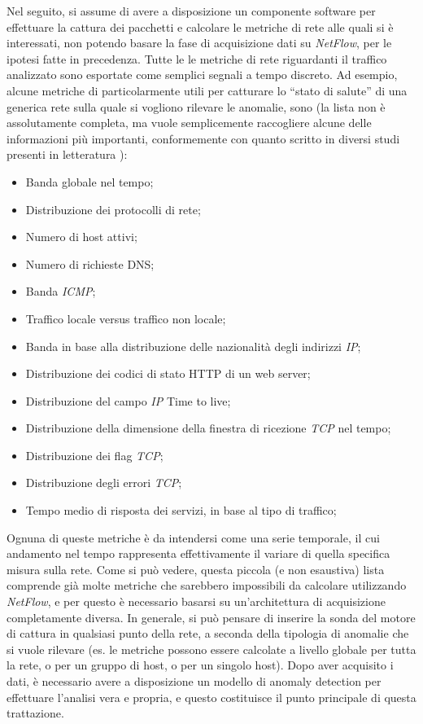 \documentclass[12pt,a4paper,cucitura]{toptesi}
\begin{document}
Nel seguito, si assume di avere a disposizione un componente software per effettuare la cattura dei pacchetti e calcolare le metriche di rete alle quali si è interessati, non potendo basare la fase di acquisizione dati su \emph{NetFlow}, per le ipotesi fatte in precedenza.
Tutte le le metriche di rete riguardanti il traffico analizzato sono esportate come semplici segnali a tempo discreto.
Ad esempio, alcune metriche di particolarmente utili per catturare lo ``stato di salute'' di una generica rete sulla quale si vogliono rilevare le anomalie, sono (la lista non è assolutamente completa, ma vuole semplicemente raccogliere alcune delle informazioni più importanti, conformemente con quanto scritto in diversi studi presenti in letteratura \cite{ntop}):

\begin{itemize}
\item Banda globale nel tempo; 
\item Distribuzione dei protocolli di rete;
\item Numero di host attivi;
\item Numero di richieste DNS;
\item Banda \emph{ICMP};
\item Traffico locale versus traffico non locale;
\item Banda in base alla distribuzione delle nazionalità degli indirizzi \emph{IP};
\item Distribuzione dei codici di stato HTTP di un web server;
\item Distribuzione del campo \emph{IP} Time to live;
\item Distribuzione della dimensione della finestra di ricezione \emph{TCP} nel tempo;
\item Distribuzione dei flag \emph{TCP};
\item Distribuzione degli errori \emph{TCP};
\item Tempo medio di risposta dei servizi, in base al tipo di traffico;
\end{itemize}

Ognuna di queste metriche è da intendersi come una serie temporale, il cui andamento nel tempo rappresenta effettivamente il variare di quella specifica misura sulla rete.
Come si può vedere, questa piccola (e non esaustiva) lista comprende già molte metriche che sarebbero impossibili da calcolare utilizzando \emph{NetFlow}, e per questo è necessario basarsi su un'architettura di acquisizione completamente diversa.
In generale, si può pensare di inserire la sonda del motore di cattura in qualsiasi punto della rete, a seconda della tipologia di anomalie che si vuole rilevare (es. le metriche possono essere calcolate a livello globale per tutta la rete, o per un gruppo di host, o per un singolo host).
Dopo aver acquisito i dati, è necessario avere a disposizione un modello di anomaly detection per effettuare l'analisi vera e propria, e questo costituisce il punto principale di questa trattazione.
\end{document}
